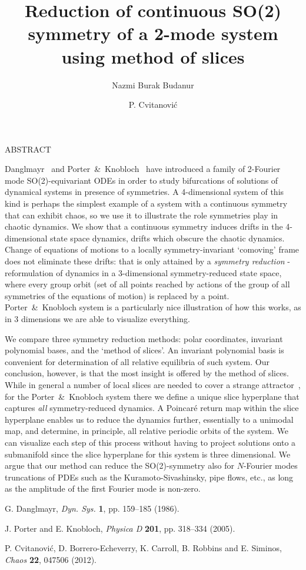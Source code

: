 \documentclass[11pt]{article}
\title{Reduction of continuous SO(2) symmetry of a 2-mode system using method of slices}
\date{}
\author[1]{Nazmi Burak Budanur}
\author[1]{P. Cvitanovi\'{c}}
\affil[1]{School of Physics and Center for Nonlinear Dynamics,
		  Georgia Inst. of Technology,
		  Atlanta, GA  30332, USA \emailaddress{budanur3@gatech.edu}}
\newcommand{\smalllineskip}{\baselineskip=15pt}
\renewenvironment{abstract}[0]{\small\rm
        \begin{center}ABSTRACT
        \\ \vspace{8pt}
        \begin{minipage}{5.2in}\smalllineskip
        \hspace{1pc}}{\end{minipage}\end{center}\vspace{-1pt}}
\begin{document}
\maketitle

\begin{abstract}

Danglmayr~\cite{Dang86} and Porter~\&\ Knobloch~\cite{PoKno05} have 
introduced a family of 2-Fourier mode SO(2)-equivariant ODEs  in order to study 
bifurcations of solutions of dynamical systems in presence of symmetries. A 
4-dimensional system of this kind is perhaps the simplest example of a system 
with a continuous symmetry that can exhibit chaos, so we use it to illustrate 
the role symmetries play in chaotic dynamics. We show that a continuous 
symmetry induces drifts in the 4-dimensional state space dynamics, drifts which 
obscure the chaotic dynamics. Change of equations of motions to a locally 
symmetry-invariant `comoving' frame does not eliminate these drifts: that is 
only attained by a \emph{symmetry reduction} - reformulation of dynamics in a 
3-dimensional symmetry-reduced state space, where every group orbit (set of all 
points reached by actions of the group of all symmetries of the equations of 
motion) is replaced by a point. Porter~\&\ Knobloch system is a particularly 
nice illustration of how this works, as in 3 dimensions we are able to 
visualize everything.

We compare three symmetry reduction methods: polar coordinates, invariant 
polynomial bases, and the `method of slices'. An invariant polynomial basis is 
convenient for determination of all relative equilibria of such system. Our 
conclusion, however, is that the most insight is offered by the method of 
slices. While in general a number of local slices are needed to cover a 
strange attractor~\cite{atlas12}, for the Porter~\&\ Knobloch system there we 
define a unique slice hyperplane that captures \emph{all} symmetry-reduced 
dynamics. A Poincar\'e return map within the slice hyperplane enables us to 
reduce the dynamics further, essentially to a unimodal map, and determine, in 
principle, all relative periodic orbits of the system. We can visualize each 
step of this process without having to project solutions onto a submanifold 
since the slice hyperplane for this system is three dimensional. We argue that 
our method can reduce the SO(2)-symmetry also for $N$-Fourier modes truncations 
of PDEs such as the Kuramoto-Sivashinsky, pipe flows, etc., as long as the 
amplitude of the first Fourier mode is non-zero.

\end{abstract}

\begin{thebibliography}{99}
\small

G. Danglmayr,  {\it Dyn. Sys.} {\bf 1}, pp. 159--185 (1986).

J. Porter and E. Knobloch, {\it Physica D} {\bf 201}, pp. 318--334 (2005).

P. Cvitanovi\'{c}, D. Borrero-Echeverry, K. Carroll, B. Robbins and
E. Siminos, {\it Chaos} {\bf 22}, 047506 (2012).

\end{thebibliography}
\end{document}
